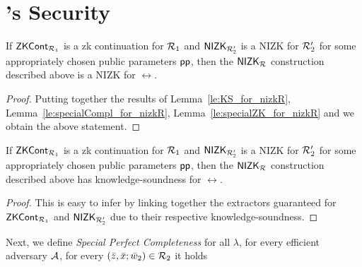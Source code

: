 
\section{\nizkR's Security}
\label{ap:nizkR}
\begin{theorem}
	If ${\mathsf{ZKCont}}_{\mathcal{R}_1}$ is a zk continuation for $\mathcal{R}_1$ and ${\mathsf{NIZK_{\mathcal{R}'_2}}}$ is a NIZK for $\mathcal{R}_2'$ for some appropriately chosen public parameters $\mathsf{pp}$, 
	then the ${\mathsf{NIZK_{\mathcal{R}}}}$ construction described above is a NIZK for $\rel$.
\end{theorem}
\begin{proof} Putting together the results of Lemma~\ref{le:KS_for_nizkR}, Lemma~\ref{le:specialCompl_for_nizkR}, 
	Lemma~\ref{le:specialZK_for_nizkR} and  we obtain the above statement.
\end{proof} 
\begin{lemma} 
	\label{le:KS_for_nizkR}
	If ${\mathsf{ZKCont}}_{\mathcal{R}_1}$ is a zk continuation for $\mathcal{R}_1$ and ${\mathsf{NIZK_{\mathcal{R}'_2}}}$ is a NIZK for $\mathcal{R}_2'$ for some appropriately chosen public parameters $\mathsf{pp}$, 
	then the ${\mathsf{NIZK_{\mathcal{R}}}}$ construction described above has knowledge-soundness for $\rel$. 
\end{lemma} 
\begin{proof}This is easy to infer by linking together the extractors guaranteed for ${\mathsf{ZKCont}}_{\mathcal{R}_1}$ and ${\mathsf{NIZK_{\mathcal{R}'_2}}}$ due to their respective 
	knowledge-soundness.
\end{proof}
\noindent Next, we define 
\emph{Special Perfect Completeness} for all $\lambda $, for every efficient adversary $\mathcal{A}$, for every 
$(\bar{z}, \bar{x}; \bar{w}_2) \in \mathcal{R}_2$ it holds
